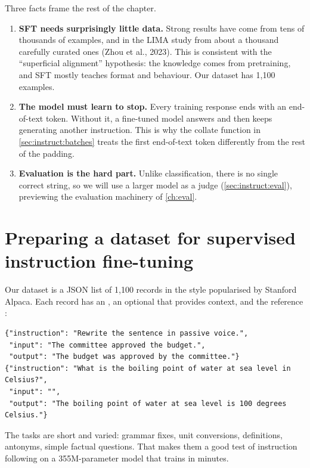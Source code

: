 Three facts frame the rest of the chapter.
\begin{enumerate}
\item \textbf{SFT needs surprisingly little data.} Strong results have come from tens of
thousands of examples, and in the LIMA study from about a thousand carefully curated
ones (Zhou et al., 2023). This is consistent with the ``superficial alignment''
hypothesis: the knowledge comes from pretraining, and SFT mostly teaches format and
behaviour. Our dataset has 1{,}100 examples.
\item \textbf{The model must learn to stop.} Every training response ends with an
end-of-text token. Without it, a fine-tuned model answers and then keeps generating
another instruction. This is why the collate function in \cref{sec:instruct:batches}
treats the first end-of-text token differently from the rest of the padding.
\item \textbf{Evaluation is the hard part.} Unlike classification, there is no single
correct string, so we will use a larger model as a judge (\cref{sec:instruct:eval}),
previewing the evaluation machinery of \cref{ch:eval}.
\end{enumerate}

\section{Preparing a dataset for supervised instruction fine-tuning}\label{sec:instruct:data}

Our dataset is a JSON list of 1{,}100 records in the style popularised by Stanford
Alpaca. Each record has an , an optional  that provides
context, and the reference :

\begin{lstlisting}[style=plain]
{"instruction": "Rewrite the sentence in passive voice.",
 "input": "The committee approved the budget.",
 "output": "The budget was approved by the committee."}
{"instruction": "What is the boiling point of water at sea level in Celsius?",
 "input": "",
 "output": "The boiling point of water at sea level is 100 degrees Celsius."}
\end{lstlisting}

The tasks are short and varied: grammar fixes, unit conversions, definitions,
antonyms, simple factual questions. That makes them a good test of instruction
following on a 355M-parameter model that trains in minutes.

